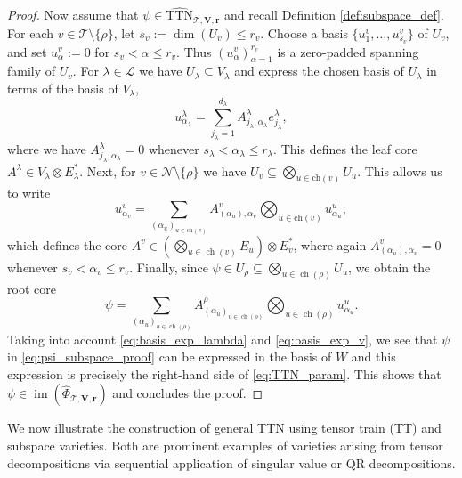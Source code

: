 \documentclass[12pt]{article}
\theoremstyle{definition}
\numberwithin{theorem}{section}
\begin{document}
\begin{proof}
Now assume that $\psi \in \widehat{\mathrm{TTN}}_{\mathscr T,\mathbf V,\mathbf r}$ and recall Definition \ref{def:subspace_def}. For each $v\in\mathscr T\setminus\{\rho\}$, let $s_v:=\dim(U_v)\leq r_v.$
Choose a basis $\{u_1^v,\ldots,u_{s_v}^v\}$
of $U_v$, and set $u_\alpha^v:=0$ for $s_v<\alpha\leq r_v$.
Thus $(u_\alpha^v)_{\alpha=1}^{r_v}$ is a zero-padded spanning
family of $U_v$. 
For $\lambda \in \mathscr{L}$ we have $U_\lambda \subseteq V_\lambda$ and express the chosen basis of $U_\lambda$ in terms of the basis of $V_\lambda$,
    \begin{equation}\label{eq:basis_exp_lambda}
        u^\lambda_{\alpha_\lambda} = \sum_{j_\lambda=1}^{d_\lambda}A^\lambda_{j_\lambda, \alpha_\lambda}e^\lambda_{j_\lambda},
    \end{equation}
    where we have $A^\lambda_{j_\lambda, \alpha_\lambda} = 0$ whenever $s_\lambda < \alpha_\lambda \leq r_\lambda$.
    This defines the leaf core $A^\lambda \in V_\lambda \otimes E_\lambda^*$. 
    Next, for $v \in \mathscr N \setminus \{\rho\}$ we have  $U_v \subseteq \bigotimes_{u\in \mathrm{ch}(v)}U_u$. This allows us to write
    \begin{equation}\label{eq:basis_exp_v}
        u^v_{\alpha_v} = \sum_{(\alpha_u)_{u\in\mathrm{ch}(v)}} A^v_{(\alpha_u),\alpha_v}\bigotimes_{u\in\mathrm{ch}(v)}u^{u}_{\alpha_{u}},
    \end{equation}
    which defines the core $A^v \in \left(\bigotimes_{u\in\operatorname{ch}(v)}E_u \right) \otimes E_v^*$, where again $A^v_{(\alpha_u),\alpha_v} = 0$ whenever $s_v < \alpha_v \leq r_v$.
    Finally, since $ \psi\in U_\rho \subseteq    \bigotimes_{u\in\operatorname{ch}(\rho)}U_u$, we obtain the root core 
    \begin{equation}\label{eq:psi_subspace_proof}
    \psi
    =
    \sum_{(\alpha_u)_{u\in\operatorname{ch}(\rho)}}
    A^\rho_{(\alpha_u)_{u\in\operatorname{ch}(\rho)}}
    \bigotimes_{u\in\operatorname{ch}(\rho)}
    u^u_{\alpha_u}.
    \end{equation}
 Taking into account \eqref{eq:basis_exp_lambda} and \eqref{eq:basis_exp_v}, we see that $\psi$ in \eqref{eq:psi_subspace_proof} can be expressed in the basis of $W$ and this expression is precisely the right-hand side of \eqref{eq:TTN_param}. This shows that 
    $\psi \in 
    \operatorname{im} (\widehat{\Phi}_{\mathscr T,\mathbf V,\mathbf r})$  and concludes the proof.   
\end{proof}
\noindent
We now illustrate the construction of general TTN using tensor train (TT) and subspace varieties. Both are prominent examples of varieties arising from tensor decompositions via sequential application of singular value or QR decompositions.
\end{document}
